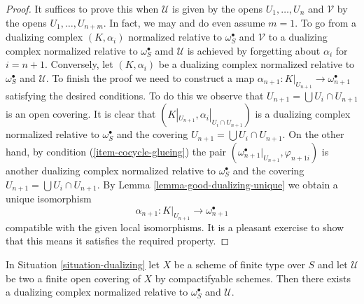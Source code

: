 \begin{proof}
It suffices to prove this when $\mathcal{U}$ is given by the opens
$U_1, \ldots, U_n$ and $\mathcal{V}$ by the opens $U_1, \ldots, U_{n + m}$.
In fact, we may and do even assume $m = 1$.
To go from a dualizing complex $(K, \alpha_i)$ normalized
relative to $\omega_S^\bullet$ and $\mathcal{V}$ to a
dualizing complex normalized relative to $\omega_S^\bullet$ amd $\mathcal{U}$
is achieved by forgetting about $\alpha_i$ for $i = n + 1$. Conversely, let
$(K, \alpha_i)$ be a dualizing complex normalized relative to
$\omega_S^\bullet$ and $\mathcal{U}$.
To finish the proof we need to construct a map
$\alpha_{n + 1} : K|_{U_{n + 1}} \to \omega_{n + 1}^\bullet$ satisfying
the desired conditions.
To do this we observe that $U_{n + 1} = \bigcup U_i \cap U_{n + 1}$
is an open covering.
It is clear that $(K|_{U_{n + 1}}, \alpha_i|_{U_i \cap U_{n + 1}})$
is a dualizing complex normalized relative to $\omega_S^\bullet$
and the covering $U_{n + 1} = \bigcup U_i \cap U_{n + 1}$.
On the other hand, by condition (\ref{item-cocycle-glueing}) the pair
$(\omega_{n + 1}^\bullet|_{U_{n + 1}}, \varphi_{n + 1i})$
is another dualizing complex normalized relative to $\omega_S^\bullet$
and the covering
$U_{n + 1} = \bigcup U_i \cap U_{n + 1}$.
By Lemma \ref{lemma-good-dualizing-unique} we obtain a unique isomorphism
$$
\alpha_{n + 1} : K|_{U_{n + 1}} \longrightarrow \omega_{n + 1}^\bullet
$$
compatible with the given local isomorphisms.
It is a pleasant exercise to show that this means it satisfies
the required property.
\end{proof}

\begin{lemma}
\label{lemma-existence-good-dualizing}
In Situation \ref{situation-dualizing} let $X$ be a scheme of finite type
over $S$ and let $\mathcal{U}$ be two a finite open covering
of $X$ by compactifyable schemes. Then there exists
a dualizing complex normalized relative to $\omega_S^\bullet$ and
$\mathcal{U}$.
\end{lemma}


